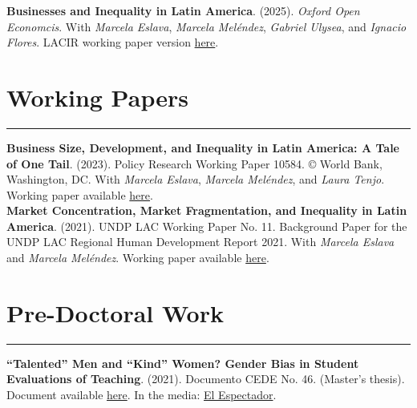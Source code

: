\documentclass[12pt, letterpaper]{article}
\begin{document}
\noindent \textbf{Businesses and Inequality in Latin America}. (2025). \textit{Oxford Open Economcis}.   With \textit{Marcela Eslava}, \textit{Marcela Meléndez}, \textit{Gabriel Ulysea}, and \textit{Ignacio Flores}. LACIR working paper version \href{https://eprints.lse.ac.uk/122760/1/WP_138.pdf}{here}. 

\vspace*{-4mm}

\section*{Working Papers}
\vspace*{-8mm}
\noindent \rule{\linewidth}{0.2mm}

\noindent \textbf{Business Size, Development, and Inequality in Latin America: A Tale of One Tail}. (2023). Policy Research Working Paper 10584. © World Bank, Washington, DC. With \textit{Marcela Eslava}, \textit{Marcela Meléndez}, and \textit{Laura Tenjo}. Working paper available \href{https://nicolasurdaneta.github.io/documents/WB_Business_Size.pdf}{here}. \\ [-3mm]

\noindent \textbf{Market Concentration, Market Fragmentation, and Inequality in Latin America}. (2021). UNDP LAC Working Paper No. 11. Background Paper for the UNDP LAC Regional Human Development Report 2021.  With \textit{Marcela Eslava} and \textit{Marcela Meléndez}. Working paper available \href{https://www.latinamerica.undp.org/content/rblac/en/home/library/poverty/market-concentration--market-fragmentation--and-inequality-in-la.html}{here}. \\ [-3mm]

\vspace{-5mm}


\section*{Pre-Doctoral Work}
\vspace*{-8mm}
\noindent \rule{\linewidth}{0.2mm}
\noindent \textbf{``Talented'' Men and ``Kind'' Women? Gender Bias in Student Evaluations of Teaching}. (2021). Documento CEDE No. 46. (Master's thesis). Document available \href{https://papers.ssrn.com/sol3/papers.cfm?abstract_id=3919797}{here}. In the media: \href{https://www.elespectador.com/educacion/los-profes-crack-y-las-profes-amables-el-sesgo-de-genero-en-las-aulas/}{El Espectador}.

\vspace{-5mm}
\end{document}
